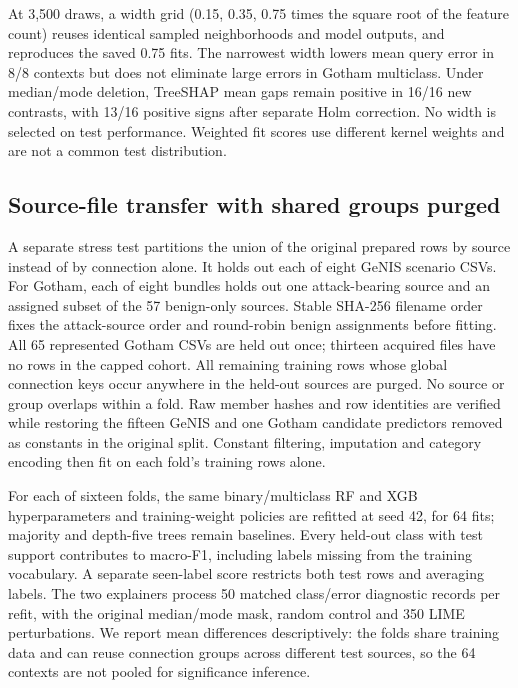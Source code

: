 \documentclass[journal,letterpaper]{IEEEtran}
\begin{document}
At 3,500 draws, a width grid (0.15, 0.35, 0.75 times the square root of the feature count) reuses identical sampled neighborhoods and model outputs, and reproduces the saved 0.75 fits. The narrowest width lowers mean query error in 8/8 contexts but does not eliminate large errors in Gotham multiclass. Under median/mode deletion, TreeSHAP mean gaps remain positive in 16/16 new contrasts, with 13/16 positive signs after separate Holm correction. No width is selected on test performance. Weighted fit scores use different kernel weights and are not a common test distribution.

\subsection{Source-file transfer with shared groups purged}
A separate stress test partitions the union of the original prepared rows by source instead of by connection alone. It holds out each of eight GeNIS scenario CSVs. For Gotham, each of eight bundles holds out one attack-bearing source and an assigned subset of the 57 benign-only sources. Stable SHA-256 filename order fixes the attack-source order and round-robin benign assignments before fitting. All 65 represented Gotham CSVs are held out once; thirteen acquired files have no rows in the capped cohort. All remaining training rows whose global connection keys occur anywhere in the held-out sources are purged. No source or group overlaps within a fold. Raw member hashes and row identities are verified while restoring the fifteen GeNIS and one Gotham candidate predictors removed as constants in the original split. Constant filtering, imputation and category encoding then fit on each fold's training rows alone.

For each of sixteen folds, the same binary/multiclass RF and XGB hyperparameters and training-weight policies are refitted at seed 42, for 64 fits; majority and depth-five trees remain baselines. Every held-out class with test support contributes to macro-F1, including labels missing from the training vocabulary. A separate seen-label score restricts both test rows and averaging labels. The two explainers process 50 matched class/error diagnostic records per refit, with the original median/mode mask, random control and 350 LIME perturbations. We report mean differences descriptively: the folds share training data and can reuse connection groups across different test sources, so the 64 contexts are not pooled for significance inference.
\end{document}
